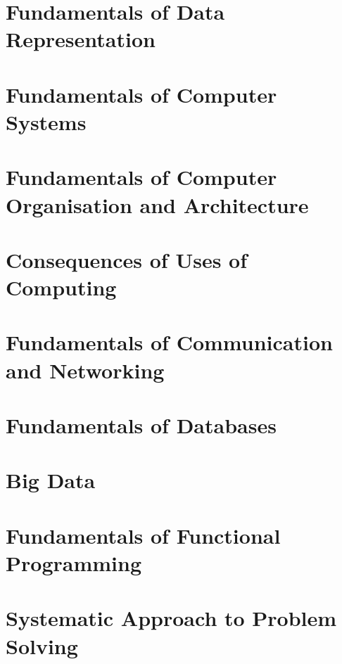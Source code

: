 \documentclass[a4paper]{article}
\begin{document}
	\section{Fundamentals of Data Representation}
		
	\section{Fundamentals of Computer Systems}
		
	\section{Fundamentals of Computer Organisation and Architecture}
		
	\section{Consequences of Uses of Computing}
		
	\section{Fundamentals of Communication and Networking}
		
	\section{Fundamentals of Databases}
		
	\section{Big Data}
		
	\section{Fundamentals of Functional Programming}
		
	\section{Systematic Approach to Problem Solving}
		
\end{document}
